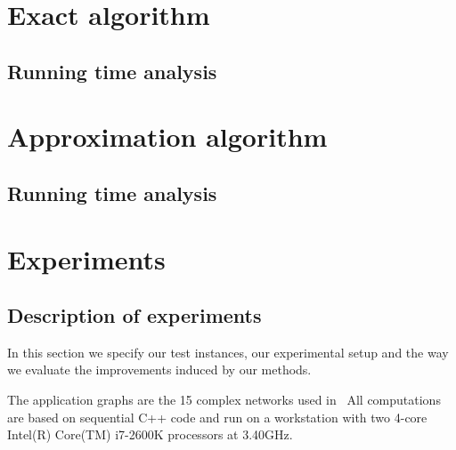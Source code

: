 \documentclass[10pt, conference, compsocconf]{IEEEtran}
\begin{document}
\section{Exact algorithm}
\label{sec:multiSwap}
\subsection{Running time analysis}

\section{Approximation algorithm}
\label{sec:multiSwap}
\subsection{Running time analysis}

%
%
\section{Experiments}
\label{sec:experiments}

\subsection{Description of experiments}
\label{subsec:setup}
%
In this section we specify our test instances, our experimental setup
and the way we evaluate the improvements induced by our methods.

The application graphs are the 15 complex networks used
in~\cite{Safro2012a} %
All computations are based on sequential C++ code and run on a workstation with two
4-core Intel(R) Core(TM) i7-2600K processors at 3.40GHz.
\end{document}
